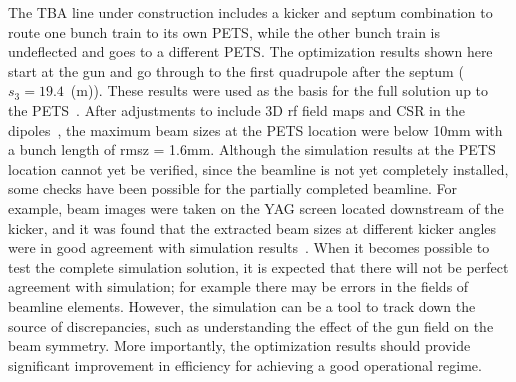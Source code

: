 The TBA line under construction includes a kicker and septum combination to route one bunch train to its own PETS, 
while the other bunch train is undeflected and goes to a different PETS.  
The optimization results shown here start at the gun and go through to the first quadrupole after the septum ($s_3=19.4$~(m)).  
These results were used as the basis for the full solution up to the PETS~\cite{neveuthesis}.
After adjustments to include 3D rf field maps and CSR in the dipoles~\cite{neveuthesis}, 
the maximum beam sizes at the PETS location were below 10mm with a bunch length of rmsz = 1.6mm.  
Although the simulation results at the PETS location cannot yet be verified, 
since the beamline is not yet completely installed, some checks have been possible for the partially completed beamline. 
For example, beam images were taken on the YAG screen located downstream of the kicker, 
and it was found that the extracted beam sizes at different kicker angles 
were in good agreement with simulation results~\cite{neveuthesis}. 
When it becomes possible to test the complete simulation solution, 
it is expected that there will not be perfect agreement with simulation; 
for example there may be errors in the fields of beamline elements. 
However, the simulation can be a tool to track down the source of discrepancies, 
such as understanding the effect of the gun field on the beam symmetry. 
More importantly, the optimization results should provide significant improvement 
in efficiency for achieving a good operational regime.

